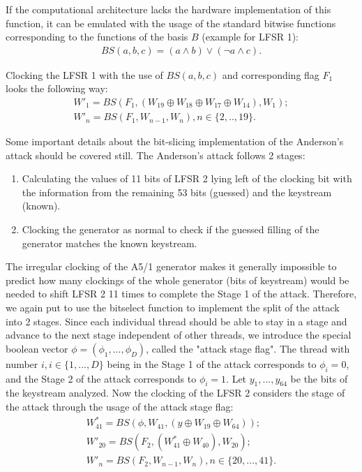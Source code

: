 \documentclass[runningheads,a4paper]{llncs}[2015/06/24]
\begin{document}
If the computational architecture lacks the hardware implementation of this
function, it can be emulated with the usage of the standard bitwise functions
corresponding to the functions of the basis $B$ (example for LFSR 1):
\begin{gather*} BS(a,b,c) = (a \wedge b) \vee (\neg a \wedge c).
\end{gather*}

Clocking the LFSR 1 with the use of $BS(a,b,c)$ and corresponding flag $F_1$
looks the following way:
\begin{gather*} 
	W'_1 = BS(F_1, (W_{19} \oplus W_{18} \oplus W_{17} \oplus W_{14}), W_1);
	\\W'_n = BS( F_1, W_{n-1}, W_n), n \in \{2,..,19\}.
\end{gather*}

Some important details about the bit-slicing implementation of the Anderson's
attack should be covered still. The Anderson's attack follows 2 stages:
\begin{enumerate} 
	\item Calculating the values of 11 bits of LFSR 2 lying left of the
	 clocking bit with the information from the remaining 53 bits (guessed) and
		the keystream (known).
	\item Clocking the generator as normal to check if the guessed filling of
	 the generator matches the known keystream.
\end{enumerate}

The irregular clocking of the A5/1 generator makes it generally impossible to
predict how many clockings of the whole generator (bits of keystream) would be
needed to shift LFSR 2 11 times to complete the Stage 1 of the attack.
Therefore, we again put to use the bitselect function to implement the split of
the attack into 2 stages. Since each individual thread should be able to stay
in a stage and advance to the next stage independent of other threads, we
introduce the special boolean vector $\phi = (\phi_1,...,\phi_D)$, called the
"attack stage flag". The thread with number $i, i \in \{1,...,D\}$ being in the
Stage 1 of the attack corresponds to $\phi_i = 0$, and the Stage 2 of the
attack corresponds to $\phi_i=1$. Let $y_1,...,y_{64}$ be the bits of the
keystream analyzed. Now the clocking of the LFSR 2 considers the stage of the
attack through the usage of the attack stage flag: \begin{gather*} W^\ast_{41}
	= BS(\phi, W_{41},(y \oplus W_{19} \oplus W_{64}));\\W'_{20} =
	BS(F_2,(W^\ast_{41} \oplus W_{40}), W_{20});\\W'_n = BS(F_2,W_{n-1},W_n), n
	\in \{20,...,41\}. 
\end{gather*}
\end{document}
